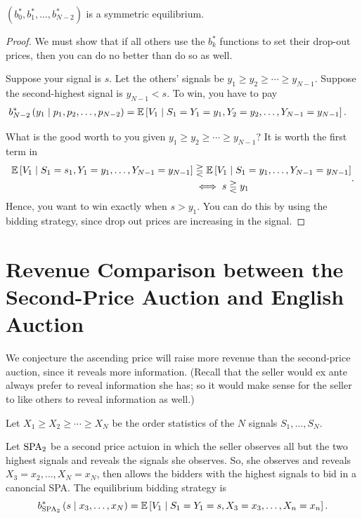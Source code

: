 \begin{proposition}	$\left( b_0^*,b_1^*,\ldots,b_{N-2}^* \right)$ is a symmetric equilibrium.
\end{proposition}

\begin{proof}
	We must show that if all others use the $b_k^*$ functions to set their drop-out prices, then you can do no better than do so as well.

	Suppose your signal is $s$. Let the others' signals be $y_1 \ge y_2 \ge \cdots \ge y_{N-1}$. Suppose the second-highest signal is $y_{N-1} < s$.
	To win, you have to pay \begin{align*}
		b_{N-2}^*\left( y_1 \mid p_1,p_2,\ldots,p_{N-2} \right) 
		&= \mathbb{E}\left[V_1 \mid S_1 = Y_1 = y_1, Y_2 = y_2, \ldots,Y_{N-1} = y_{N-1}\right]
	.\end{align*} 

		What is the good worth to you given $y_1 \ge y_2 \ge \cdots \ge y_{N-1}$?
		It is worth the first term in
		\[
			\begin{aligned}
				\mathbb{E}\left[V_1 \mid S_1 = s_1, Y_1 = y_1,\ldots,Y_{N-1} = y_{N-1}\right]
				&\gtreqless
				\mathbb{E}\left[V_1 \mid S_1 = y_1,\ldots,Y_{N-1} = y_{N-1} \right] \\
				&\iff s \gtreqless y_1
			\end{aligned}
		.\]
		Hence, you want to win exactly when $s > y_1$.
		You can do this by using the bidding strategy, since drop out prices are increasing in the signal.
\end{proof}

\section{Revenue Comparison between the Second-Price Auction and English Auction}

We conjecture the ascending price will raise more revenue than the second-price auction, since it reveals more information. (Recall that the seller would ex ante always prefer to reveal information she has; so it would make sense for the seller to like others to reveal information as well.)

Let $X_1 \ge X_2 \ge \cdots \ge X_N$ be the order statistics of the $N$ signals $S_1,\ldots,S_N$.

Let $\text{SPA}_2$ be a second price actuion in which the seller observes all but the two highest signals and reveals the signals she observes.
So, she observes and reveals $X_3=x_2,\ldots,X_N = x_N$, then allows the bidders with the highest signals to bid in a canoncial SPA. The equilibrium bidding strategy is \[
	b_{\text{SPA}_2}^{*}\left( s \mid x_3,\ldots,x_N \right)= \mathbb{E}\left[V_1 \mid S_1=Y_1=s, X_3= x_3,\ldots,X_n = x_n\right] 
.\] 

